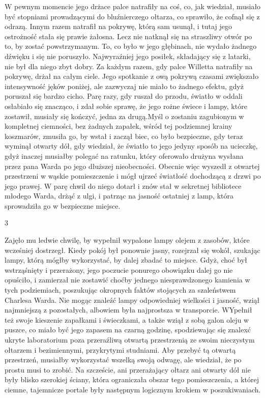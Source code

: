 W pewnym momencie jego drżace palce natrafiły na coś, co, jak wiedział, musiało być stopniami prowadzącymi do bluźnierczego ołtarza, co sprawiło, że cofnął się z odrazą. Innym razem natrafił na pokrywę, którą sam usunął, i tutaj jego ostrożność stała się prawie żałosna. Lecz nie natknął się na straszliwy otwór po to, by zostać powstrzymanym. To, co było w jego głębinach, nie wydało żadnego dźwięku i się nie poruszyło. Najwyraźniej jego posiłek, składający się z latarki, nie był dla niego zbyt dobry. Za każdym razem, gdy palce Willetta natrafiły na pokrywę, drżał na całym ciele. Jego spotkanie z ową pokrywą czasami zwiększało intensywność jęków poniżej, ale zazwyczaj nie miało to żadnego efektu, gdyż poruszał się bardzo cicho. Parę razy, gdy ruszał do przodu, światło w oddali osłabiało się znacząco, i zdał sobie sprawę, że jego rożne świece i lampy, które zostawił, musiały się kończyć, jedna za drugą.Myśl o zostaniu zagubionym w kompletnej ciemności, bez żadnych zapałek, wśród tej podziemnej krainy koszmarów, zmusiła go, by wstał i zaczął biec, co było bezpieczne, gdy teraz wyminął otwarty dół, gdy wiedział, że światło to jego jedyny sposób na ucieczkę, gdyż inaczej musiałby polegać na ratunku, który oferowało drużyna wysłana przez pana Warda po jego dłuższej nieobecności. Obecnie więc wyszedł z otwartej przestrzeni w wąskie pomieszczenie i mógł ujrzeć światłość dochodzącą z drzwi po jego prawej. W parę chwil do niego dotarł i znów stał w sekretnej bibliotece młodego Warda, drżąć z ulgi, i patrząc na jasność ostatniej z lamp, która sprowadziła go w bezpieczne miejsce.

\begin{center}
3
\end{center}

Zajęło mu ledwie chwilę, by wypełnił wypalone lampy olejem z zasobów, które wcześniej dostrzegł. Kiedy pokój był ponownie jasny, rozejrzał się wokół, szukając lampy, którą mógłby wykorzystać, by dalej zbadać to miejsce. Gdyż, choć był wstrząśnięty i przerażony, jego poczucie ponurego obowiązku dalej go nie opuściło, i zamierzał nie zostawić choćby jednego niesprawdzonego kamienia w tych podziemiach, poszukując okropnych faktów stojących za szaleństwem Charlesa Warda. Nie mogąc znaleźć lampy odpowiedniej wielkości i jasność, wziął najmniejszą z pozostałych, albowiem była najprostsza w transporcie. WYpełnił też swoje kieszenie zapałkami i świeczkami, a także wziął z sobą galon oleju w puszce, co miało być jego zapasem na czarną godzinę, spodziewając się znalexć ukryte laboratorium poza przeraźliwą otwartą przestrzenią ze swoim nieczystym ołtarzem i bezimiennymi, przykrytymi studniami. Aby przebyć tą otwartą przestrzeń, musiałby wykorzystać wszelką swoją odwagę, ale wiedział, że po prostu musi to zrobić. Na szczeście, ani przerażający ołtarz ani otwarty dół nie były blisko szerokiej ściany, która ograniczała obszar tego pomieszczenia, a której ciemne, tajemnicze portale były następnym logicznym krokiem w poszukiwaniach. 

